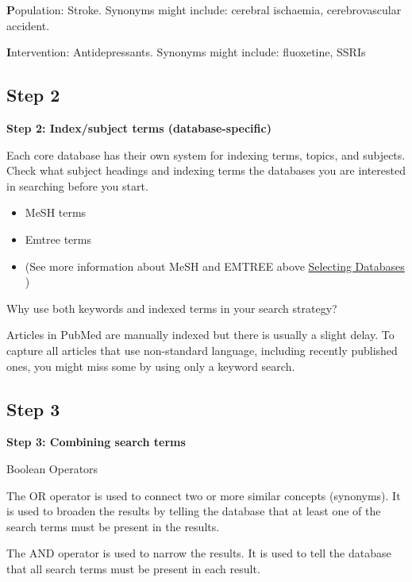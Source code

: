 \documentclass[
]{book}
\providecommand{\tightlist}{%
  \setlength{\itemsep}{0pt}\setlength{\parskip}{0pt}}
\begin{document}
\textbf{P}opulation: Stroke. Synonyms might include: cerebral ischaemia, cerebrovascular accident.

\textbf{I}ntervention: Antidepressants. Synonyms might include: fluoxetine, SSRIs

\hypertarget{step-2}{%
\subsection{Step 2}\label{step-2}}

\textbf{Step 2: Index/subject terms (database-specific)}

Each core database has their own system for indexing terms, topics, and subjects. Check what subject headings and indexing terms the databases you are interested in searching before you start.

\begin{itemize}
\tightlist
\item
  MeSH terms
\item
  Emtree terms
\item
  (See more information about MeSH and EMTREE above \protect\hyperlink{Selecting-Databases}{Selecting Databases} )
\end{itemize}

Why use both keywords and indexed terms in your search strategy?

Articles in PubMed are manually indexed but there is usually a slight delay. To capture all articles that use non-standard language, including recently published ones, you might miss some by using only a keyword search.

\hypertarget{step-3}{%
\subsection{Step 3}\label{step-3}}

\textbf{Step 3: Combining search terms}

Boolean Operators

The OR operator is used to connect two or more similar concepts (synonyms). It is used to broaden the results by telling the database that at least one of the search terms must be present in the results.

The AND operator is used to narrow the results. It is used to tell the database that all search terms must be present in each result.
\end{document}
